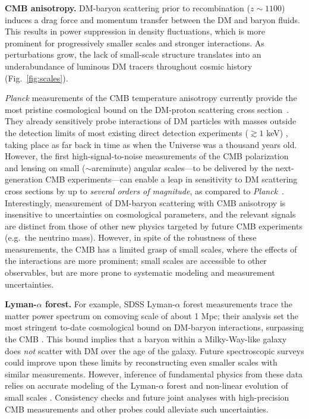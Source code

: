 \documentclass[12pt]{article}
\begin{document}
\textbf{CMB anisotropy.} 
DM-baryon scattering prior to recombination ($z\sim 1100$) induces a drag force and momentum transfer between the DM and baryon fluids. 
This results in power suppression in density fluctuations, which is more prominent for progressively smaller scales and stronger interactions.
As perturbations grow, the lack of small-scale structure translates into an underabundance of luminous DM tracers throughout cosmic history (Fig.~\ref{fig:scales}).

\textit{Planck} measurements of the CMB temperature anisotropy currently provide the most pristine cosmological bound on the DM-proton scattering cross section~\cite{Boddy:2018kfv,Gluscevic:2017ywp,Boddy:2018wzy,Xu:2018efh,Slatyer:2018aqg,Dvorkin:2013cea}.
They already sensitively probe interactions of DM particles with masses outside the detection limits of most existing direct detection experiments ($\gtrsim 1$ keV) \cite{Gluscevic:2017ywp}, taking place as far back in time as when the Universe was a thousand years old.
However, the first high-signal-to-noise measurements of the CMB polarization and lensing on small ($\sim$arcminute) angular scales---to be delivered by the next-generation CMB experiments---can enable a leap in sensitivity to DM scattering cross sections by up to \textit{several orders of magnitude}, as compared to \textit{Planck}~\cite{2018PhRvD..98l3524L,2019JCAP...02..056A,Abazajian:2016yjj,2019arXiv190210541H}.
Interestingly, measurement of DM-baryon scattering with CMB anisotropy is insensitive to uncertainties on cosmological parameters, and the relevant signals are distinct from those of other new physics targeted by future CMB experiments (e.g.~the neutrino mass). 
However, in spite of the robustness of these measurements, the CMB has a limited grasp of small scales, where the effects of the interactions are more prominent; small scales are accessible to other observables, but are more prone to systematic modeling and measurement uncertainties.

\textbf{Lyman-$\alpha$ forest.} 
For example, SDSS Lyman-$\alpha$ forest measurements trace the matter power spectrum on comoving scale of about 1 Mpc; their analysis set the most stringent to-date cosmological bound on DM-baryon interactions, surpassing the CMB  \cite{Xu:2018efh,Dvorkin:2013cga}.
This bound implies that a baryon within a Milky-Way-like galaxy does \textit{not} scatter with DM over the age of the galaxy.
Future spectroscopic surveys could improve upon these limits by reconstructing even smaller scales with similar measurements.
However, inference of fundamental physics from these data relies on accurate modeling of the Lyman-$\alpha$ forest and non-linear evolution of small scales \cite{2017PhRvD..96b3522I}.
Consistency checks and future joint analyses with high-precision CMB measurements and other probes could alleviate such uncertainties.
\end{document}
